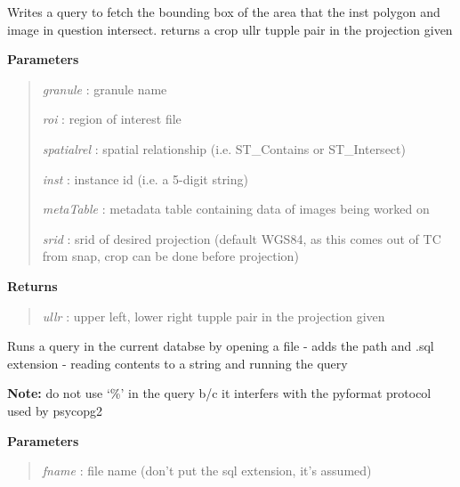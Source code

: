 \documentclass[letterpaper,10pt,openany,oneside]{sphinxmanual}
\begin{document}
\begin{fulllineitems}

\begin{fulllineitems}
\label{code:Database.Database.qryCropZone}
Writes a query to fetch the bounding box of the area that the inst polygon and
image in question intersect.
returns a crop ullr tupple pair in the projection given

\textbf{Parameters}
\begin{quote}

\emph{granule}    : granule name

\emph{roi}        : region of interest file

\emph{spatialrel} : spatial relationship (i.e. ST\_Contains or ST\_Intersect)

\emph{inst}       : instance id (i.e. a 5-digit string)

\emph{metaTable}  : metadata table containing data of images being worked on

\emph{srid}       : srid of desired projection (default WGS84, as this comes out of TC from snap, crop can be done before projection)
\end{quote}

\textbf{Returns}
\begin{quote}

\emph{ullr}       : upper left, lower right tupple pair in the projection given
\end{quote}

\end{fulllineitems}


\begin{fulllineitems}
\label{code:Database.Database.qryFromFile}
Runs a query in the current databse by opening a file - adds the path and 
.sql extension - reading contents to a string and running the query

\textbf{Note:} do not use `\%' in the query b/c it interfers with the pyformat protocol
used by psycopg2

\textbf{Parameters}
\begin{quote}

\emph{fname}  : file name (don't put the sql extension, it's assumed)


\end{quote}
\end{fulllineitems}
\end{fulllineitems}
\end{document}

